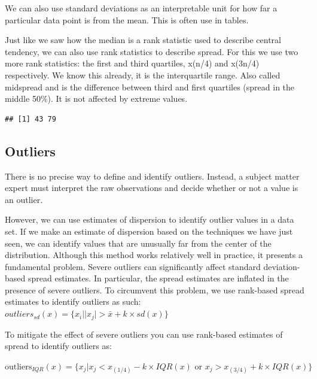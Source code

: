 \documentclass[
]{book}
\newenvironment{Shaded}{\begin{snugshade}}{\end{snugshade}}
\newcommand{\CommentTok}[1]{\textcolor[rgb]{0.56,0.35,0.01}{\textit{#1}}}
\newcommand{\FunctionTok}[1]{\textcolor[rgb]{0.00,0.00,0.00}{#1}}
\newcommand{\NormalTok}[1]{#1}
\newcommand{\SpecialCharTok}[1]{\textcolor[rgb]{0.00,0.00,0.00}{#1}}
\begin{document}
We can also use standard deviations as an interpretable unit for how far a particular data point is from the mean. This is often use in tables.

Just like we saw how the median is a rank statistic used to describe central tendency, we can also use rank statistics to describe spread.
For this we use two more rank statistics: the first and third quartiles, x(n/4) and x(3n/4) respectively. We know this already, it is the interquartile range. Also called midspread and is the difference between third and first quartiles (spread in the middle 50\%).
It is not affected by extreme values.

\begin{Shaded}
\end{Shaded}

\begin{verbatim}
## [1] 43 79
\end{verbatim}

\hypertarget{outliers}{%
\subsection{Outliers}\label{outliers}}

There is no precise way to define and identify outliers. Instead, a subject matter expert must interpret the raw observations and decide whether or not a value is an outlier.

However, we can use estimates of dispersion to identify outlier values in a data set. If we make an estimate of dispersion based on the techniques we have just seen, we can identify values that are unusually far from the center of the distribution. Although this method works relatively well in practice, it presents a fundamental problem. Severe outliers can significantly affect standard deviation-based spread estimates. In particular, the spread estimates are inflated in the presence of severe outliers. To circumvent this problem, we use rank-based spread estimates to identify outliers as such:
\(outliers_{sd}(x)= \{x_i||x_j|>\bar{x}+k \times sd(x)\}\)

To mitigate the effect of severe outliers you can use rank-based estimates of spread to identify outliers as:

\(\mbox{outliers}_{IQR}(x)= \{x_j|x_j < x_{(1/4)} - k \times IQR(x) \mbox{ or } x_j > x_{(3/4)} + k \times IQR(x) \}\)
\end{document}
